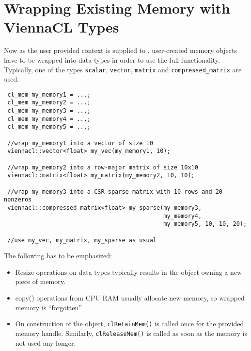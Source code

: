 \section{Wrapping Existing Memory with ViennaCL Types}
Now as the user provided context is supplied to {\ViennaCL}, user-created memory objects have to be wrapped into {\ViennaCL} data-types in order to use the full functionality.
Typically, one of the types \lstinline|scalar|, \lstinline|vector|, \lstinline|matrix| and \lstinline|compressed_matrix| are used:
\begin{lstlisting}
 cl_mem my_memory1 = ...;
 cl_mem my_memory2 = ...;
 cl_mem my_memory3 = ...;
 cl_mem my_memory4 = ...;
 cl_mem my_memory5 = ...;
 
 //wrap my_memory1 into a vector of size 10
 viennacl::vector<float> my_vec(my_memory1, 10);

 //wrap my_memory2 into a row-major matrix of size 10x10
 viennacl::matrix<float> my_matrix(my_memory2, 10, 10);

 //wrap my_memory3 into a CSR sparse matrix with 10 rows and 20 nonzeros
 viennacl::compressed_matrix<float> my_sparse(my_memory3,
                                              my_memory4,
                                              my_memory5, 10, 10, 20);

 //use my_vec, my_matrix, my_sparse as usual
\end{lstlisting}
The following has to be emphasized:
\begin{itemize}
 \item Resize operations on {\ViennaCL} data types typically results in the object owning a new piece of memory.
 \item copy() operations from CPU RAM usually allocate new memory, so wrapped memory is ``forgotten''
 \item On construction of the {\ViennaCL} object, \lstinline|clRetainMem()| is called once for the provided memory handle. Similarly, \lstinline|clReleaseMem()| is called as soon as the memory is not used any longer.
\end{itemize}



